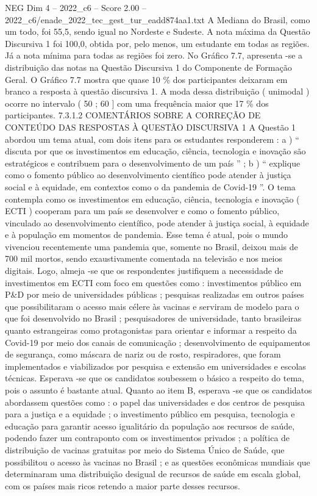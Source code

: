 \begin{textsample}{NEG Dim 4 – 2022\_c6 – Score 2.00 – 2022\_c6/enade\_2022\_tec\_gest\_tur\_eadd874aa1.txt}
A Mediana do Brasil, como um todo, foi 55,5, sendo igual no Nordeste e Sudeste.
A nota máxima da Questão Discursiva 1 foi 100,0, obtida por, pelo menos, um estudante em todas as regiões.
Já a nota mínima para todas as regiões foi zero.
No Gráfico 7.7, apresenta -se a distribuição das notas na Questão Discursiva 1 do Componente de Formação Geral.
O Gráfico 7.7 mostra que quase 10 \% dos participantes deixaram em branco a resposta à questão discursiva 1.
A moda dessa distribuição ( unimodal ) ocorre no intervalo ( 50 ; 60 ] com uma frequência maior que 17 \% dos participantes. 7.3.1.2 COMENTÁRIOS SOBRE A CORREÇÃO DE CONTEÚDO DAS RESPOSTAS À QUESTÃO DISCURSIVA 1 A Questão 1 abordou um tema atual, com dois itens para os estudantes responderem : a ) “ discuta por que os investimentos em educação, ciência, tecnologia e inovação são estratégicos e contribuem para o desenvolvimento de um país ” ; b ) “ explique como o fomento público ao desenvolvimento científico pode atender à justiça social e à equidade, em contextos como o da pandemia de Covid-19 ”.
O tema contempla como os investimentos em educação, ciência, tecnologia e inovação ( ECTI ) cooperam para um país se desenvolver e como o fomento público, vinculado ao desenvolvimento científico, pode atender à justiça social, à equidade e à população em momentos de pandemia.
Esse tema é atual, pois o mundo vivenciou recentemente uma pandemia que, somente no Brasil, deixou mais de 700 mil mortos, sendo exaustivamente comentada na televisão e nos meios digitais.
Logo, almeja -se que os respondentes justifiquem a necessidade de investimentos em ECTI com foco em questões como : investimentos público em P\&D por meio de universidades públicas ; pesquisas realizadas em outros países que possibilitaram o acesso mais célere às vacinas e serviram de modelo para o que foi desenvolvido no Brasil ; pesquisadores de universidade, tanto brasileiras quanto estrangeiras como protagonistas para orientar e informar a respeito da Covid-19 por meio dos canais de comunicação ; desenvolvimento de equipamentos de segurança, como máscara de nariz ou de rosto, respiradores, que foram implementados e viabilizados por pesquisa e extensão em universidades e escolas técnicas.
Esperava -se que os candidatos soubessem o básico a respeito do tema, pois o assunto é bastante atual.
Quanto ao item B, esperava -se que os candidatos abordassem questões como : o papel das universidades e dos centros de pesquisa para a justiça e a equidade ; o investimento público em pesquisa, tecnologia e educação para garantir acesso igualitário da população aos recursos de saúde, podendo fazer um contraponto com os investimentos privados ; a política de distribuição de vacinas gratuitas por meio do Sistema Único de Saúde, que possibilitou o acesso às vacinas no Brasil ; e as questões econômicas mundiais que determinaram uma distribuição desigual de recursos de saúde em escala global, com os países mais ricos retendo a maior parte desses recursos.

\end{textsample}
